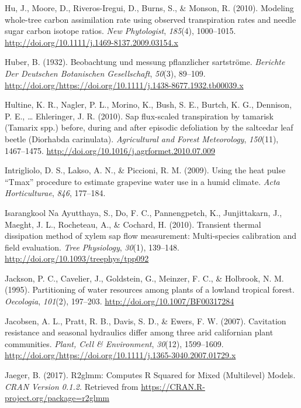 \documentclass[11pt,twoside]{reedthesis}
\begin{document}
\hypertarget{ref-Hu2010}{}
Hu, J., Moore, D., Riveros-Iregui, D., Burns, S., \& Monson, R. (2010).
Modeling whole-tree carbon assimilation rate using observed
transpiration rates and needle sugar carbon isotope ratios. \emph{New
Phytologist}, \emph{185}(4), 1000--1015.
\url{http://doi.org/10.1111/j.1469-8137.2009.03154.x}

\hypertarget{ref-Huber1932}{}
Huber, B. (1932). Beobachtung und messung pflanzlicher sartströme.
\emph{Berichte Der Deutschen Botanischen Gesellschaft}, \emph{50}(3),
89--109.
\url{http://doi.org/https://doi.org/10.1111/j.1438-8677.1932.tb00039.x}

\hypertarget{ref-Hultine2010}{}
Hultine, K. R., Nagler, P. L., Morino, K., Bush, S. E., Burtch, K. G.,
Dennison, P. E., \ldots{} Ehleringer, J. R. (2010). Sap flux-scaled
transpiration by tamarisk (Tamarix spp.) before, during and after
episodic defoliation by the saltcedar leaf beetle (Diorhabda
carinulata). \emph{Agricultural and Forest Meteorology}, \emph{150}(11),
1467--1475. \url{http://doi.org/10.1016/j.agrformet.2010.07.009}

\hypertarget{ref-Intrigliolo2009}{}
Intrigliolo, D. S., Lakso, A. N., \& Piccioni, R. M. (2009). Using the
heat pulse ``Tmax'' procedure to estimate grapevine water use in a humid
climate. \emph{Acta Horticulturae}, \emph{846}, 177--184.

\hypertarget{ref-IsarangkoolNaAyutthaya2010}{}
Isarangkool Na Ayutthaya, S., Do, F. C., Pannengpetch, K., Junjittakarn,
J., Maeght, J. L., Rocheteau, A., \& Cochard, H. (2010). Transient
thermal dissipation method of xylem sap flow measurement: Multi-species
calibration and field evaluation. \emph{Tree Physiology}, \emph{30}(1),
139--148. \url{http://doi.org/10.1093/treephys/tpp092}

\hypertarget{ref-jackson_partitioning_1995}{}
Jackson, P. C., Cavelier, J., Goldstein, G., Meinzer, F. C., \&
Holbrook, N. M. (1995). Partitioning of water resources among plants of
a lowland tropical forest. \emph{Oecologia}, \emph{101}(2), 197--203.
\url{http://doi.org/10.1007/BF00317284}

\hypertarget{ref-Jacobsen2007}{}
Jacobsen, A. L., Pratt, R. B., Davis, S. D., \& Ewers, F. W. (2007).
Cavitation resistance and seasonal hydraulics differ among three arid
californian plant communities. \emph{Plant, Cell \& Environment},
\emph{30}(12), 1599--1609.
\url{http://doi.org/https://doi.org/10.1111/j.1365-3040.2007.01729.x}

\hypertarget{ref-jaeger_r2glmm_2017}{}
Jaeger, B. (2017). R2glmm: Computes R Squared for Mixed (Multilevel)
Models. \emph{CRAN Version 0.1.2.} Retrieved from
\url{https://CRAN.R-project.org/package=r2glmm}
\end{document}
